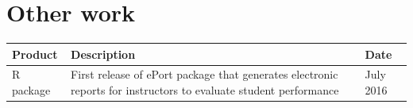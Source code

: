 \documentclass[11pt,a4paper,oldfontcommands,openany]{memoir}
\numberwithin{equation}{section} %
\begin{document}
\section{Other work}

\begin{tabular}{|p{3cm}|p{8cm}|p{3cm}|}
 \hline
 \textbf{Product} & \textbf{Description} & \textbf{Date} \\ 
 \hline
 R package & First release of ePort package that generates electronic reports for instructors to evaluate student performance & July 2016 \\
 \hline
\end{tabular}


\end{document}
